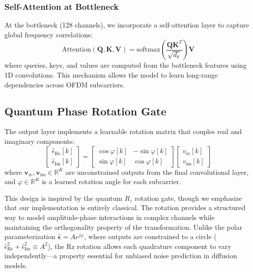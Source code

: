 \documentclass[conference]{IEEEtran}
\begin{document}
\subsubsection{Self-Attention at Bottleneck}

At the bottleneck (128 channels), we incorporate a self-attention layer to capture global frequency correlations:
\begin{equation}
\text{Attention}(\mathbf{Q}, \mathbf{K}, \mathbf{V}) = \text{softmax}\left(\frac{\mathbf{Q}\mathbf{K}^T}{\sqrt{d_k}}\right)\mathbf{V}
\end{equation}
where queries, keys, and values are computed from the bottleneck features using 1D convolutions. This mechanism allows the model to learn long-range dependencies across OFDM subcarriers.

\subsection{Quantum Phase Rotation Gate}

The output layer implements a learnable rotation matrix that couples real and imaginary components:
\begin{equation}
\begin{bmatrix} \hat{\epsilon}_{\text{Re}}[k] \\ \hat{\epsilon}_{\text{Im}}[k] \end{bmatrix} = \begin{bmatrix} \cos\varphi[k] & -\sin\varphi[k] \\ \sin\varphi[k] & \cos\varphi[k] \end{bmatrix} \begin{bmatrix} v_{\text{re}}[k] \\ v_{\text{im}}[k] \end{bmatrix}
\end{equation}
where $\mathbf{v}_{\text{re}}, \mathbf{v}_{\text{im}} \in \mathbb{R}^K$ are unconstrained outputs from the final convolutional layer, and $\varphi \in \mathbb{R}^K$ is a learned rotation angle for each subcarrier.

This design is inspired by the quantum $R_z$ rotation gate, though we emphasize that our implementation is entirely classical. The rotation provides a structured way to model amplitude-phase interactions in complex channels while maintaining the orthogonality property of the transformation. Unlike the polar parameterization $\hat{\boldsymbol{\epsilon}} = Ae^{j\varphi}$, where outputs are constrained to a circle ($\hat{\epsilon}_{\mathrm{Re}}^2 + \hat{\epsilon}_{\mathrm{Im}}^2 \equiv A^2$), the Rz rotation allows each quadrature component to vary independently—a property essential for unbiased noise prediction in diffusion models.
\end{document}
